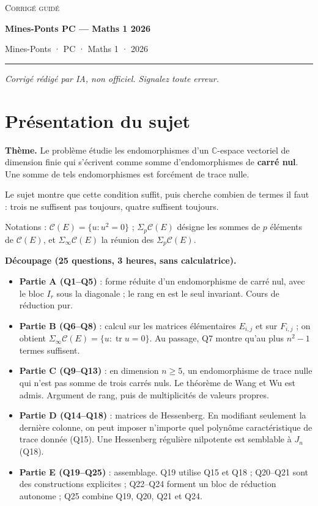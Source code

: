 \documentclass[11pt,a4paper]{article}
\providecommand{\tightlist}{\setlength{\itemsep}{0pt}\setlength{\parskip}{0pt}}
\begin{document}
\thispagestyle{plain}
\begin{center}
  {\small\scshape Corrigé guidé}\par\smallskip
  {\LARGE\bfseries Mines-Ponts PC — Maths 1 2026\par}\medskip
  {\large Mines-Ponts · PC · Maths 1 · 2026\par}
\end{center}
\vspace{2pt}\hrule\vspace{8pt}

\emph{Corrigé rédigé par IA, non officiel. Signalez toute erreur.}

\hypertarget{pruxe9sentation-du-sujet}{%
\section{Présentation du sujet}\label{pruxe9sentation-du-sujet}}

\textbf{Thème.} Le problème étudie les endomorphismes d'un \(\mathbb C\)-espace vectoriel de dimension finie qui s'écrivent comme somme d'endomorphismes de \textbf{carré nul}. Une somme de tels endomorphismes est forcément de trace nulle.

Le sujet montre que cette condition suffit, puis cherche combien de termes il faut : trois ne suffisent pas toujours, quatre suffisent toujours.

Notations : \(\mathcal C(E)=\{u:u^2=0\}\) ; \(\Sigma_p\mathcal C(E)\) désigne les sommes de \(p\) éléments de \(\mathcal C(E)\), et \(\Sigma_\infty\mathcal C(E)\) la réunion des \(\Sigma_p\mathcal C(E)\).

\textbf{Découpage (25 questions, 3 heures, sans calculatrice).}

\begin{itemize}
\tightlist
\item
  \textbf{Partie A (Q1--Q5)} : forme réduite d'un endomorphisme de carré nul, avec le bloc \(I_r\) sous la diagonale ; le rang en est le seul invariant. Cours de réduction pur.
\item
  \textbf{Partie B (Q6--Q8)} : calcul sur les matrices élémentaires \(E_{i,j}\) et sur \(F_{i,j}\) ; on obtient \(\Sigma_\infty\mathcal C(E)=\{u:\operatorname{tr}u=0\}\). Au passage, Q7 montre qu'au plus \(n^2-1\) termes suffisent.
\item
  \textbf{Partie C (Q9--Q13)} : en dimension \(n\ge5\), un endomorphisme de trace nulle qui n'est pas somme de trois carrés nuls. Le théorème de Wang et Wu est admis. Argument de rang, puis de multiplicités de valeurs propres.
\item
  \textbf{Partie D (Q14--Q18)} : matrices de Hessenberg. En modifiant seulement la dernière colonne, on peut imposer n'importe quel polynôme caractéristique de trace donnée (Q15). Une Hessenberg régulière nilpotente est semblable à \(J_n\) (Q18).
\item
  \textbf{Partie E (Q19--Q25)} : assemblage. Q19 utilise Q15 et Q18 ; Q20--Q21 sont des constructions explicites ; Q22--Q24 forment un bloc de réduction autonome ; Q25 combine Q19, Q20, Q21 et Q24.
\end{itemize}
\end{document}
